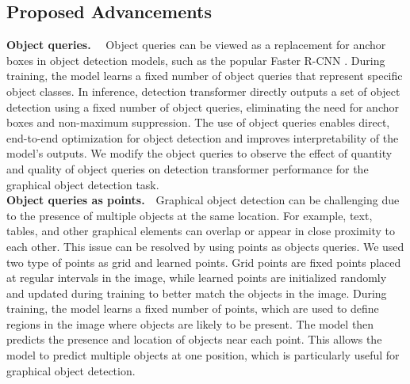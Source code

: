 \documentclass[sn-mathphys]{sn-jnl}\jyear{2021}\theoremstyle{thmstyleone}\newtheorem{theorem}{Theorem}\newtheorem{proposition}[theorem]{Proposition}\theoremstyle{thmstyletwo}\newtheorem{example}{Example}\newtheorem{remark}{Remark}\theoremstyle{thmstylethree}\newtheorem{definition}{Definition}\usepackage{amsmath}
\begin{document}
\subsection{Proposed Advancements}
\noindent\textbf {Object queries.}~~
Object queries can be viewed as a replacement for anchor boxes in object detection models, such as the popular Faster R-CNN \cite{faster23}. During training, the model learns a fixed number of object queries that represent specific object classes. In inference, detection transformer directly outputs a set of object detection using a fixed number of object queries, eliminating the need for anchor boxes and non-maximum suppression. The use of object queries enables direct, end-to-end optimization for object detection and improves interpretability of the model's outputs. We modify the object queries to observe the effect of quantity and quality of object queries on detection transformer performance for the graphical object detection task.\\
\noindent\textbf {Object queries as points.}~~Graphical object detection can be challenging due to the presence of multiple objects at the same location. For example, text, tables, and other graphical elements can overlap or appear in close proximity to each other. This issue can be resolved by using points as objects queries. We used two type of points as grid and learned points. Grid points are fixed points placed at regular intervals in the image, while learned points are initialized randomly and updated during training to better match the objects in the image. During training, the model learns a fixed number of points, which are used to define regions in the image where objects are likely to be present. The model then predicts the presence and location of objects near each point. This allows the model to predict multiple objects at one position, which is particularly useful for graphical object detection.
 
\end{document}
